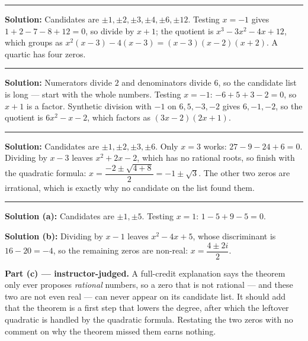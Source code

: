 \documentclass[12pt]{article}
\begin{document}
\vspace{0.15cm}
\noindent\rule{\linewidth}{0.2pt}


\textbf{Solution:} Candidates are $\pm 1, \pm 2, \pm 3, \pm 4, \pm 6, \pm 12$.
Testing $x = -1$ gives $1 + 2 - 7 - 8 + 12 = 0$, so divide by $x + 1$; the
quotient is $x^{3} - 3x^{2} - 4x + 12$, which groups as
$x^{2}(x - 3) - 4(x - 3) = (x - 3)(x - 2)(x + 2)$. A quartic has four zeros.

\vspace{0.15cm}
\noindent\rule{\linewidth}{0.2pt}


\textbf{Solution:} Numerators divide $2$ and denominators divide $6$, so the
candidate list is long --- start with the whole numbers. Testing $x = -1$:
$-6 + 5 + 3 - 2 = 0$, so $x + 1$ is a factor. Synthetic division with $-1$ on
$6, 5, -3, -2$ gives $6, -1, -2$, so the quotient is $6x^{2} - x - 2$, which
factors as $(3x - 2)(2x + 1)$. 

\vspace{0.15cm}
\noindent\rule{\linewidth}{0.2pt}


\textbf{Solution:} Candidates are $\pm 1, \pm 2, \pm 3, \pm 6$. Only $x = 3$
works: $27 - 9 - 24 + 6 = 0$. Dividing by $x - 3$ leaves $x^{2} + 2x - 2$, which
has no rational roots, so finish with the quadratic formula:
$x = \dfrac{-2 \pm \sqrt{4 + 8}}{2} = -1 \pm \sqrt{3}$. The other two zeros are
irrational, which is exactly why no candidate on the list found them.

\vspace{0.15cm}
\noindent\rule{\linewidth}{0.2pt}


\textbf{Solution (a):} Candidates are $\pm 1, \pm 5$. Testing $x = 1$:
$1 - 5 + 9 - 5 = 0$. 

\textbf{Solution (b):} Dividing by $x - 1$ leaves $x^{2} - 4x + 5$, whose
discriminant is $16 - 20 = -4$, so the remaining zeros are non-real:
$x = \dfrac{4 \pm 2i}{2}$. 

\textbf{Part (c) --- instructor-judged.} A full-credit explanation says the
theorem only ever proposes \emph{rational} numbers, so a zero that is not
rational --- and these two are not even real --- can never appear on its
candidate list. It should add that the theorem is a first step that lowers the
degree, after which the leftover quadratic is handled by the quadratic formula.
Restating the two zeros with no comment on why the theorem missed them earns
nothing.
\end{document}
